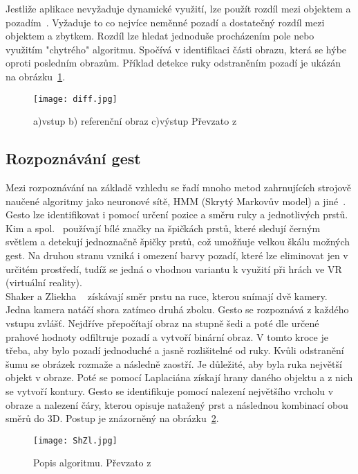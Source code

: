 Jestliže aplikace nevyžaduje dynamické využití, lze použít rozdíl mezi objektem a pozadím~\cite{14}. Vyžaduje to co nejvíce neměnné pozadí a dostatečný rozdíl mezi objektem a zbytkem. Rozdíl lze hledat jednoduše procházením pole nebo využitím "chytrého" algoritmu. Spočívá v identifikaci části obrazu, která se hýbe oproti posledním obrazům. Příklad detekce ruky odstraněním pozadí je ukázán na obrázku~\ref{pic6}.

\begin{figure}[h]
\centering
\texttt{[image: diff.jpg]}
\caption{a)vstup  b) referenční obraz  c)výstup 
Převzato z ~\cite{14} } 
\label{pic6}
\end{figure}


\subsection{Rozpoznávání gest}
Mezi rozpoznávání na základě vzhledu se řadí mnoho metod zahrnujících strojově naučené algoritmy jako neuronové sítě, HMM (Skrytý Markovův model) a jiné~\cite{3}. Gesto lze identifikovat i pomocí určení pozice a směru ruky a jednotlivých prstů.\\ %

Kim a spol.~\cite{5} používají bílé značky na špičkách prstů, které sledují černým světlem a detekují jednoznačně špičky prstů, což umožňuje velkou škálu možných gest. Na druhou stranu vzniká i omezení barvy pozadí, které lze eliminovat jen v určitém prostředí, tudíž se jedná o vhodnou variantu k využití při hrách ve VR (virtuální reality).\\

Shaker a Zliekha ~\cite{12} získávají směr prstu na ruce, kterou snímají dvě kamery. Jedna kamera natáčí shora zatímco druhá zboku. Gesto se rozpoznává z každého vstupu zvlášť. Nejdříve přepočítají obraz na stupně šedi a poté dle určené prahové hodnoty odfiltruje pozadí a vytvoří binární obraz. V tomto kroce je třeba, aby bylo pozadí jednoduché a jasně rozlišitelné od ruky. Kvůli odstranění šumu se obrázek rozmaže a následně zaostří. Je důležité, aby byla ruka největší objekt v obraze. Poté se pomocí Laplaciána získají hrany daného objektu a z nich se vytvoří kontury.
Gesto se identifikuje pomocí nalezení největšího vrcholu v obraze a nalezení čáry, kterou opisuje natažený prst a následnou kombinací obou směrů do 3D. Postup je znázorněný na obrázku~\ref{pic7}.
\begin{figure}[h]
\centering
\texttt{[image: ShZl.jpg]}
\caption{Popis algoritmu. Převzato z ~\cite{12} } 
\label{pic7}
\end{figure}

